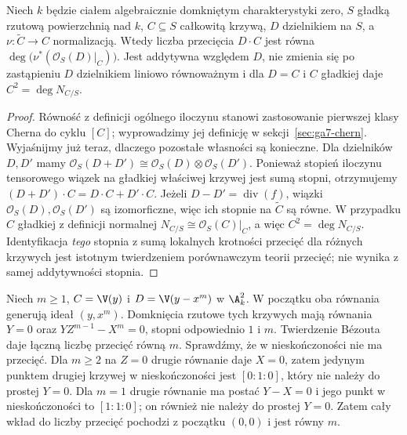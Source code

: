 \begin{stwierdzenie}
\label{st:ga7-divisor-degree}
Niech $k$ będzie ciałem algebraicznie domkniętym
charakterystyki zero, $S$ gładką rzutową powierzchnią
nad $k$, $C\subseteq S$ całkowitą krzywą,
$D$ dzielnikiem na $S$, a $\nu:\widetilde C\to C$
normalizacją. Wtedy liczba przecięcia $D\cdot C$ jest równa
$\deg\bigl(\nu^*(\mathcal O_S(D)|_C)\bigr)$.
Jest addytywna względem $D$, nie zmienia się po
zastąpieniu $D$ dzielnikiem liniowo równoważnym i
dla $D=C$ i $C$ gładkiej daje $C^2=\deg N_{C/S}$.
\end{stwierdzenie}
\begin{proof}
Równość z definicji ogólnego iloczynu stanowi
zastosowanie pierwszej klasy Cherna do cyklu $[C]$;
wyprowadzimy jej definicję w sekcji~\ref{sec:ga7-chern}.
Wyjaśnijmy już teraz, dlaczego pozostałe własności są
konieczne. Dla dzielników $D,D'$ mamy
$\mathcal O_S(D+D')\cong\mathcal O_S(D)\otimes\mathcal O_S(D')$.
Ponieważ stopień iloczynu tensorowego wiązek na gładkiej
właściwej krzywej jest sumą stopni, otrzymujemy
$(D+D')\cdot C=D\cdot C+D'\cdot C$.
Jeżeli $D-D'=\operatorname{div}(f)$, wiązki
$\mathcal O_S(D),\mathcal O_S(D')$ są izomorficzne,
więc ich stopnie na $\widetilde C$ są równe.
W przypadku $C$ gładkiej z definicji normalnej
$N_{C/S}\cong\mathcal O_S(C)|_C$,
a więc $C^2=\deg N_{C/S}$.
Identyfikacja \emph{tego} stopnia z sumą lokalnych
krotności przecięć dla różnych krzywych jest
istotnym twierdzeniem porównawczym teorii przecięć;
nie wynika z samej addytywności stopnia.
\end{proof}

\begin{przyklad}
Niech $m\ge1$, $C=\V(y)$ i $D=\V(y-x^m)$ w $\A^2_k$.
W początku oba równania generują ideał $(y,x^m)$.
Domknięcia rzutowe tych krzywych mają równania
$Y=0$ oraz $YZ^{m-1}-X^m=0$, stopni odpowiednio
$1$ i $m$. Twierdzenie Bézouta daje łączną liczbę
przecięć równą $m$.
Sprawdźmy, że w nieskończoności nie ma przecięć.
Dla $m\ge2$ na $Z=0$ drugie równanie daje $X=0$,
zatem jedynym punktem drugiej krzywej w nieskończoności
jest $[0:1:0]$, który nie należy do prostej $Y=0$.
Dla $m=1$ drugie równanie ma postać $Y-X=0$
i jego punkt w nieskończoności to $[1:1:0]$;
on również nie należy do prostej $Y=0$.
Zatem cały wkład do liczby przecięć pochodzi
z początku $(0,0)$ i jest równy $m$.
\end{przyklad}

